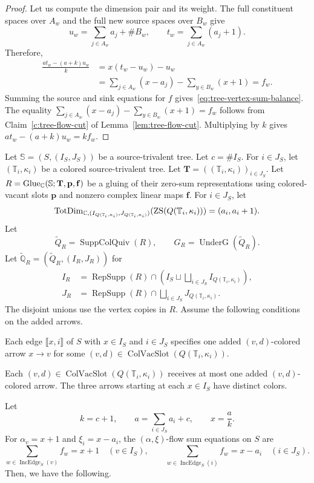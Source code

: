 \begin{proof}
Let us compute the dimension pair and its weight.
The full constituent spaces over $A_w$ and the full new source spaces over $B_w$ give
\[
 u_w=\sum_{j\in A_w}a_j+\#B_w,\qquad
 t_w=\sum_{j\in A_w}(a_j+1).
\]
Therefore,
\[
\begin{aligned}
 \frac{at_w-(a+k)u_w}{k}
 &=x(t_w-u_w)-u_w\\
 &=\sum_{j\in A_w}(x-a_j)-\sum_{y\in B_w}(x+1)=f_w.
\end{aligned}
\]
Summing the source and sink equations for $f$ gives~\eqref{eq:tree-vertex-sum-balance}.
The equality $\sum_{j\in A_w}(x-a_j)-\sum_{y\in B_w}(x+1)=f_w$ follows from Claim~\ref{c:tree-flow-cut} of Lemma~\ref{lem:tree-flow-cut}.
Multiplying by $k$ gives $at_w-(a+k)u_w=kf_w$.
\end{proof}

\begin{lemma}\label{lem:flow-stability}
Let $\mathbb S=(S,(I_S,J_S))$ be a source-trivalent tree.
Let $c=\#I_{S}$.
For $i\in J_S$, let $(\mathbb T_i,\kappa_i)$ be a colored source-trivalent tree.
Let $\mathbf T=((\mathbb T_i,\kappa_i))_{i\in J_S}$.
Let $R=\operatorname{Glue}_{\mathbb C}(\mathbb S;\mathbf T,\mathbf p,\mathbf f)$ be a gluing of their zero-sum representations using colored-vacant slots $\mathbf p$ and nonzero complex linear maps $\mathbf f$.
For $i\in J_S$, let
\[
 \operatorname{TotDim}_{\mathbb C,(I_{Q(\mathbb T_i,\kappa_i)},J_{Q(\mathbb T_i,\kappa_i)})}
 (\operatorname{ZS}(Q(\mathbb T_i,\kappa_i)))=(a_i,a_i+1).
\]
Let
\[
 \widetilde Q_R=\operatorname{SuppColQuiv}(R),\qquad
 G_R=\operatorname{UnderG}(\widetilde Q_R).
\]
Let $\widetilde{\mathbb Q}_R=(\widetilde Q_R,(I_R,J_R))$ for
\[
\begin{aligned}
 I_R&=\operatorname{RepSupp}(R)\cap
 \left(I_S\sqcup\bigsqcup_{i\in J_S}I_{Q(\mathbb T_i,\kappa_i)}\right),\\
 J_R&=\operatorname{RepSupp}(R)\cap
 \bigsqcup_{i\in J_S}J_{Q(\mathbb T_i,\kappa_i)}.
\end{aligned}
\]
The disjoint unions use the vertex copies in $R$.
Assume the following conditions on the added arrows.
\begin{hypotheses}
\item\label{hyp:gluing-attachments} Each edge $\llbracket x,i\rrbracket$ of $S$ with $x\in I_{S}$ and $i\in J_{S}$ specifies one added $(v,d)$-colored arrow $x\to v$ for some $(v,d)\in\operatorname{ColVacSlot}(Q(\mathbb T_i,\kappa_i))$.
\item\label{hyp:gluing-slots} Each $(v,d)\in\operatorname{ColVacSlot}(Q(\mathbb T_i,\kappa_i))$ receives at most one added $(v,d)$-colored arrow. The three arrows starting at each $x\in I_{S}$ have distinct colors.
\end{hypotheses}
Let
\[
 k=c+1,\qquad a=\sum_{i\in J_{S}}a_i+c,\qquad x=\frac ak.
\]
For $\alpha_v=x+1$ and $\xi_i=x-a_i$, the $(\alpha,\xi)$-flow sum equations on $S$ are
\begin{equation}
\sum_{w\in\operatorname{IncEdge}_S(v)}f_w=x+1\quad(v\in I_{S}),\qquad
\sum_{w\in\operatorname{IncEdge}_S(i)}f_w=x-a_i\quad(i\in J_{S}).\label{flow}
\end{equation}
Then, we have the following.


\end{lemma}

